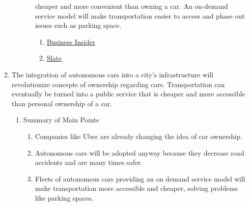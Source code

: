 \documentclass{article}
\begin{document}
\begin{enumerate}
\begin{enumerate}
\begin{enumerate}
        cheaper and more convenient than owning a car. An on-demand service
        model will make transportation easier to access and phase out issues
        such as parking space.
      \begin{enumerate}
        \item \href{http://www.businessinsider.com/why-no-one-will-own-a-car-in-25-years-2015-6}{\underline{Business Insider}}
        \item \href{http://www.slate.com/articles/technology/future_tense/2016/10/self_driving_cars_effects_on_cities_depend_on_who_owns_them.html}{\underline{Slate}}
      \end{enumerate}
    \end{enumerate}
  \end{enumerate}
  \item The integration of autonomous cars into a city's infrastructure will
    revolutionize concepts of ownership regarding cars. Transportation can
    eventually be turned into a public service that is cheaper and more
    accessible than personal ownership of a car.
  \begin{enumerate}
    \item Summary of Main Points
    \begin{enumerate}
      \item Companies like Uber are already changing the idea of car ownership.
      \item Autonomous cars will be adopted anyway because they decrease road
        accidents and are many times safer.
      \item Fleets of autonomous cars providing an on demand service model will
        make transportation more accessible and cheaper, solving problems like
        parking spaces.
    \end{enumerate}
  \end{enumerate}
\end{enumerate}
\end{document}
